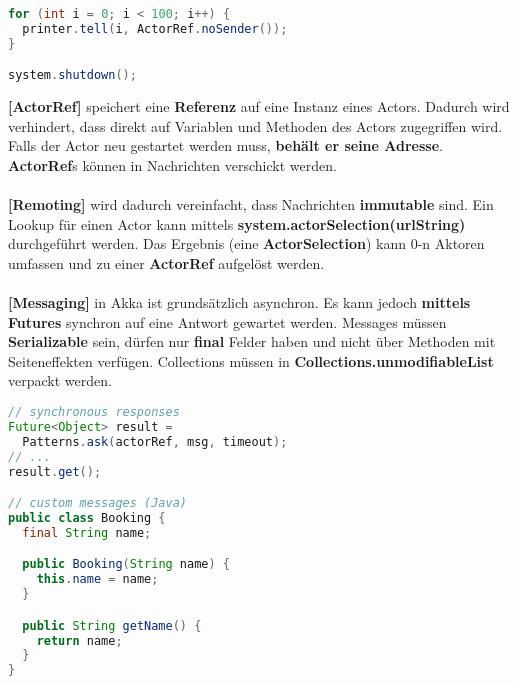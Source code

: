 \documentclass[8pt]{extarticle}
\let\oldtextbf\textbf
\renewcommand{\textbf}{\tiny\oldtextbf}
\begin{document}
\begin{multicols*}{5}
\begin{lstlisting}[language=java]
for (int i = 0; i < 100; i++) {
  printer.tell(i, ActorRef.noSender());
}

system.shutdown();
\end{lstlisting}
\textbf{[ActorRef]} speichert eine \textbf{Referenz} auf eine Instanz eines Actors. Dadurch wird verhindert, dass direkt auf Variablen und Methoden des Actors zugegriffen wird. Falls der Actor neu gestartet werden muss, \textbf{behält er seine Adresse}. \textbf{ActorRef}s können in Nachrichten verschickt werden.\\\\
\textbf{[Remoting]} wird dadurch vereinfacht, dass Nachrichten \textbf{immutable} sind. Ein Lookup für einen Actor kann mittels \textbf{system.actorSelection(urlString)} durchgeführt werden. Das Ergebnis (eine \textbf{ActorSelection}) kann 0-n Aktoren umfassen und zu einer \textbf{ActorRef} aufgelöst werden.\\\\
\textbf{[Messaging]} in Akka ist grundsätzlich asynchron. Es kann jedoch \textbf{mittels Futures} synchron auf eine Antwort gewartet werden. Messages müssen \textbf{Serializable} sein, dürfen nur \textbf{final} Felder haben und nicht über Methoden mit Seiteneffekten verfügen. Collections müssen in \textbf{Collections.unmodifiableList} verpackt werden.
\begin{lstlisting}[language=java]
// synchronous responses
Future<Object> result =
  Patterns.ask(actorRef, msg, timeout);
// ...
result.get();

// custom messages (Java)
public class Booking {
  final String name;

  public Booking(String name) {
    this.name = name;
  }

  public String getName() {
    return name;
  }
}


\end{lstlisting}
\end{multicols*}
\end{document}
